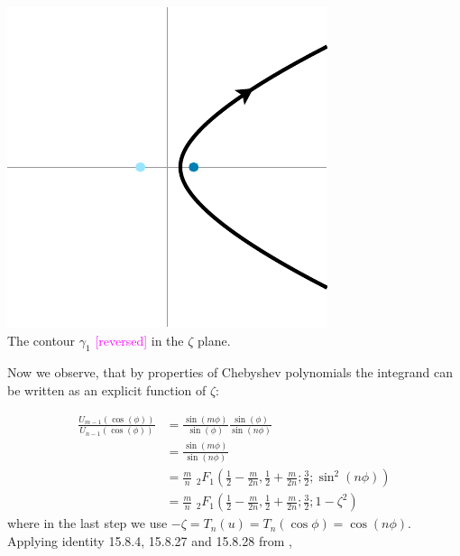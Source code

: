 \documentclass{article}
\theoremstyle{definition}
\begin{document}
\begin{center}
\includegraphics{figures/zeta_contour_3.pdf} \\[1em]
{\small The contour $\gamma_1$ \textcolor{magenta}{[reversed]} in the $\zeta$ plane.}
\end{center}

Now we observe, that by properties of Chebyshev polynomials the integrand can be written as an explicit function of $\zeta$: 

\begin{align*}
    \frac{U_{m-1}(\cos(\phi))}{U_{n-1}(\cos(\phi))}&=\frac{\sin(m\phi)}{\sin(\phi)}\frac{\sin(\phi)}{\sin(n \phi)}\\
    &=\frac{\sin(m\phi)}{\sin(n \phi)}\\
    &=\frac{m}{n}\,\, {}_2F_1\left(\frac{1}{2}-\frac{m}{2n},\frac{1}{2}+\frac{m}{2n};\frac{3}{2};\sin^2(n \phi)\right)\\
    &=\frac{m}{n}\,\, {}_2F_1\left(\frac{1}{2}-\frac{m}{2n},\frac{1}{2}+\frac{m}{2n};\frac{3}{2};1-\zeta^2\right) 
\end{align*}
where in the last step we use $-\zeta=T_n(u)=T_n(\cos\phi)=\cos(n\phi)$. Applying identity 15.8.4, 15.8.27 and 15.8.28 from \cite{dlmf}, 
\end{document}
